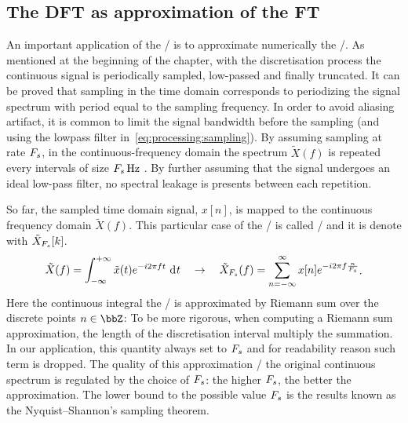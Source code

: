 \subsection{The DFT as approximation of the FT}\label{subsec:processing:ftapprox}
An important application of the \DFT/ is to approximate numerically the \FT/.
As mentioned at the beginning of the chapter, with the discretisation process the continuous signal is periodically sampled, low-passed and finally truncated.
It can be proved that sampling in the time domain corresponds to periodizing the signal spectrum with period equal to the sampling frequency.
In order to avoid aliasing artifact, it is common to limit the signal bandwidth before the sampling (and using the lowpass filter in~\cref{eq:processing:sampling}).
By assuming sampling at rate $F_s$, in the continuous-frequency domain the spectrum $\tilde{X}(f)$ is repeated every intervals of size $\Fs\,\si{\Hz}$ .
By further assuming that the signal undergoes an ideal low-pass filter, no spectral leakage is presents between each repetition.

\mynewline
So far, the sampled time domain signal, $x[n]$, is mapped to the continuous frequency domain $\tilde{X}(f)$.
This particular case of the \FT/ is called \DTFTdef/ and it is denote with $\tilde{X}_{F_s}[ k]$.
\begin{equation}\label{eq:processing:ft2dtft}
    \begin{aligned}
        \tilde{X}(f) =
        \int_{-\infty}^{+\infty}
        \tilde{x}(t)
        \cste^{-\csti 2 \pi f t}
        \,\kdiff{t}
        \quad \rightarrow \quad
        \tilde{X}_{\Fs}( f) =
        \sum_{n = -\infty}^{\infty}
        x[ n]
        \cste^{-\csti2\pi f \frac{n}{\Fs}}
    \end{aligned}
    .
\end{equation}
Here the continuous integral the \FT/ is approximated by Riemann sum over the discrete points $n \in \Z$:
To be more rigorous, when computing a Riemann sum approximation, the length of the discretisation interval multiply the summation.
In our application, this quantity always set to $F_s$ and for readability reason such term is dropped.
The quality of this approximation \wrt/ the original continuous spectrum is regulated by the choice of $F_s$: the higher $F_s$, the better the approximation.
The lower bound to the possible value $F_s$ is the results known as the Nyquist–Shannon's sampling theorem.

